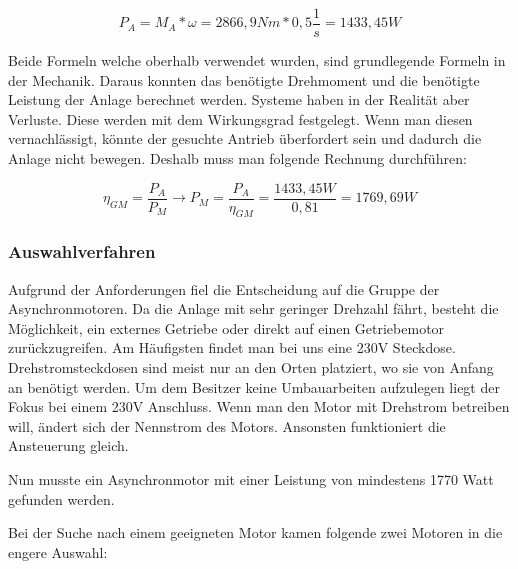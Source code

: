  
\begin{center}
\begin{equation}
  \label{eq:3}
	P_{A} = M_{A} * \omega = 2866,9 Nm * 0,5 \dfrac{1}{s} = 1433,45W
\end{equation} 
\end{center}

Beide Formeln welche oberhalb verwendet wurden, sind grundlegende Formeln in der Mechanik. Daraus konnten das benötigte Drehmoment und die benötigte Leistung der Anlage berechnet werden. Systeme haben in der Realität aber Verluste. Diese werden mit dem Wirkungsgrad festgelegt. Wenn man diesen vernachlässigt, könnte der gesuchte Antrieb überfordert sein und dadurch die Anlage nicht bewegen. Deshalb muss man folgende Rechnung durchführen:

\begin{center}
\begin{equation}
  \label{eq:4}
	\eta_{GM}= \frac{P_{A}}{P_{M}} \rightarrow P_{M} = \frac{P_{A}}{\eta_{GM}} = \frac{1433,45W}{0,81} = 1769,69W
\end{equation} 
\end{center}

\subsubsection{Auswahlverfahren}
\label{sec:auswahlverfahren}

Aufgrund der Anforderungen fiel die Entscheidung auf die Gruppe der Asynchronmotoren. Da die Anlage mit sehr geringer Drehzahl fährt, besteht die Möglichkeit, ein externes Getriebe oder direkt auf einen Getriebemotor zurückzugreifen. 
Am Häufigsten findet man bei uns eine 230V Steckdose. Drehstromsteckdosen sind meist nur an den Orten platziert, wo sie von Anfang an benötigt werden. Um dem Besitzer keine Umbauarbeiten aufzulegen liegt der Fokus bei einem 230V Anschluss. Wenn man den Motor mit Drehstrom betreiben will, ändert sich der Nennstrom des Motors. Ansonsten funktioniert die Ansteuerung gleich.

Nun musste ein Asynchronmotor mit einer Leistung von mindestens 1770 Watt gefunden werden.

Bei der Suche nach einem geeigneten Motor kamen folgende zwei Motoren in die engere Auswahl:

\newpage


